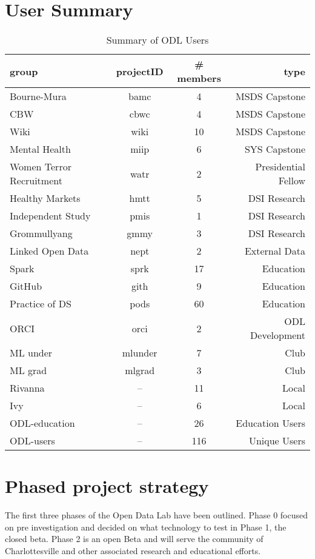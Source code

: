 \pagebreak
\section{User Summary}

\begin{table}
\begin{center}
\begin{tabular}{lccr}
\hline
\hline
group & projectID & \# members & type \\
\hline
\hline
Bourne-Mura & bamc & 4 & MSDS Capstone \\
CBW & cbwc & 4 & MSDS Capstone\\
Wiki & wiki & 10 & MSDS Capstone\\
Mental Health & miip & 6 & SYS Capstone\\
\hline
Women Terror Recruitment & watr & 2 & Presidential Fellow\\
\hline
Healthy Markets & hmtt & 5 & DSI Research\\
Independent Study & pmis & 1 & DSI Research\\
Grommullyang &gmmy & 3 & DSI Research\\
\hline
Linked Open Data   & nept & 2 & External Data\\
\hline
Spark & sprk & 17 & Education \\
GitHub & gith & 9 & Education \\
Practice of DS & pods & 60 & Education \\ 
\hline
ORCI & orci & 2 & ODL Development\\
\hline
ML under & mlunder & 7 & Club\\
ML grad & mlgrad & 3 & Club\\
\hline
Rivanna & -- & 11 & Local\\
Ivy & -- & 6 & Local\\
\hline
\hline
ODL-education  & -- & 26 & Education Users\\
ODL-users & -- & 116 & Unique Users\\
\hline
\hline
\end{tabular}
\caption{Summary of ODL Users}
\end{center}
\end{table}

\section{Phased project strategy}
\label{phases}
The first three phases of the Open Data Lab have been outlined. Phase 0 focused on pre investigation and decided on what technology to test in Phase 1, the closed beta. Phase 2 is an open Beta and will serve the community of Charlottesville and other associated research and educational efforts.

